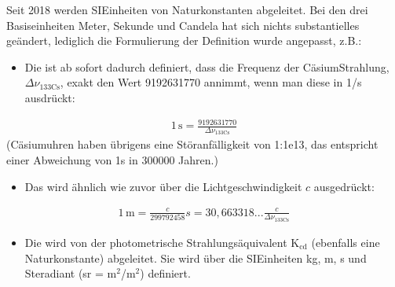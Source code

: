 \documentclass[letterpaper,10pt,english]{jupyterBook}
\begin{document}
\sphinxAtStartPar
Seit 2018 werden  SI\sphinxhyphen{}Einheiten von Naturkonstanten abgeleitet. Bei den drei Basiseinheiten Meter, Sekunde und Candela hat sich nichts substantielles geändert, lediglich die Formulierung der Definition wurde angepasst, z.B.:
\begin{itemize}
\item {} 
\sphinxAtStartPar
Die  ist ab sofort dadurch definiert, dass die Frequenz der Cäsium\sphinxhyphen{}Strahlung, \(\Delta \nu_\mathrm{133Cs}\), exakt den Wert 9192631770 annimmt, wenn man diese in 1/s ausdrückt:

\end{itemize}
\begin{equation*}
\begin{split}1\,\mathrm s = \frac{9192631770}{\Delta \nu_\mathrm{133Cs}}\end{split}
\end{equation*}
\sphinxAtStartPar
(Cäsiumuhren haben übrigens eine Störanfälligkeit von 1:1e13, das entspricht einer Abweichung von 1s in 300000 Jahren.)
\begin{itemize}
\item {} 
\sphinxAtStartPar
Das  wird ähnlich wie zuvor über die Lichtgeschwindigkeit \(c\) ausgedrückt:

\end{itemize}
\begin{equation*}
\begin{split}1\,\mathrm m = \frac{c}{299 792 458} s = 30,663318...\frac{c}{\Delta \nu_\mathrm{133Cs}}\end{split}
\end{equation*}\begin{itemize}
\item {} 
\sphinxAtStartPar
Die  wird von der photometrische Strahlungsäquivalent \(\mathrm K_\mathrm{cd}\) (ebenfalls eine Naturkonstante) abgeleitet. Sie wird über die SI\sphinxhyphen{}Einheiten kg, m, s und Steradiant (sr = m\(^2\)/m\(^2\)) definiert.

\end{itemize}
\end{document}
